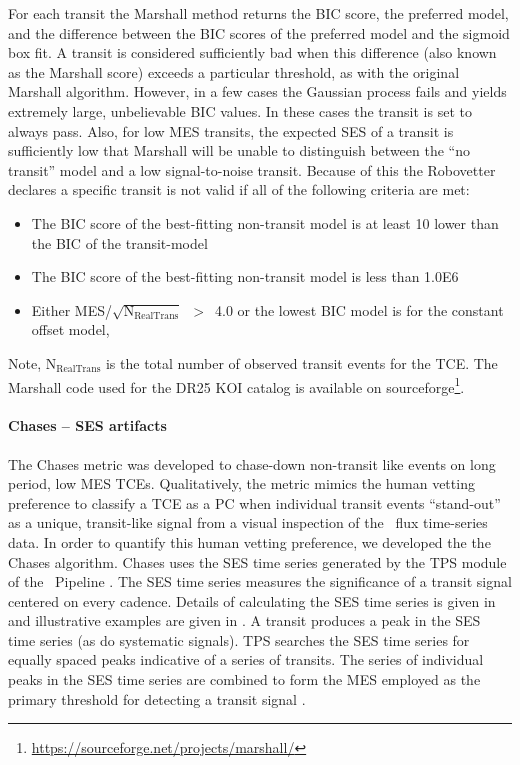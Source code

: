 For each transit the Marshall method returns the BIC score, the preferred model, and the difference between the BIC scores of the preferred model and the sigmoid box fit.  A transit is considered sufficiently bad when this difference (also known as the Marshall score) exceeds a particular threshold, as with the original Marshall algorithm.  However, in a few cases the Gaussian process fails and yields extremely large, unbelievable BIC values. In these cases the transit is set to always pass.  Also, for low MES transits, the expected SES of a transit is sufficiently low that Marshall will be unable to distinguish between the ``no transit'' model and a low signal-to-noise transit.  Because of this the Robovetter declares a specific transit is not valid if all of the following criteria are met:

\begin{itemize}
\item The BIC score of the best-fitting non-transit model is at least 10 lower than the BIC of the transit-model
\item The BIC score of the best-fitting non-transit model is less than 1.0E6
\item Either MES/$\sqrt{\textrm{N}_{\textrm{RealTrans}}}$~$>$~4.0 or the lowest BIC model is for the constant offset model, 
\end{itemize}

Note, N$_{\textrm{RealTrans}}$ is the total number of observed transit events for the TCE. The Marshall code used for the DR25 KOI catalog is available on sourceforge\footnote{ \url{https://sourceforge.net/projects/marshall/}}.


\paragraph{Chases -- SES artifacts}
\label{s:chases}

The Chases metric was developed to chase-down non-transit like events on long period, low MES TCEs. Qualitatively, the metric mimics the human vetting preference to classify a TCE as a PC when individual transit events ``stand-out'' as a unique, transit-like signal from a visual inspection of the \kepler\ flux time-series data.  In order to quantify this human vetting preference, we developed the the Chases algorithm. Chases uses the SES time series generated by the TPS module of the \kepler\ Pipeline \citep{JenkinsKDPH}.  The SES time series measures the significance of a transit signal centered on every cadence.  Details of calculating the SES time series is given in \citet{Jenkins2002a} and illustrative examples are given in \citet{Tenenbaum2012}. A transit produces a peak in the SES time series (as do systematic signals). TPS searches the SES time series for equally spaced peaks indicative of a series of transits. The series of individual peaks in the SES time series are combined to form the MES employed as the primary threshold for detecting a transit signal \citep{Jenkins2002a,Twicken2016,JenkinsKDPH}.  


